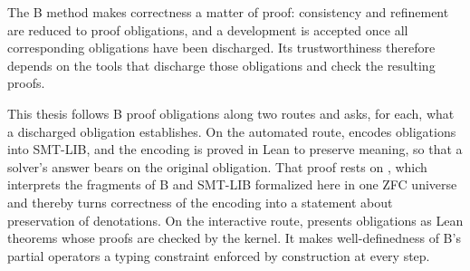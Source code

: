 The B method makes correctness a matter of proof: consistency and refinement are
reduced to proof obligations, and a development is accepted once all
corresponding obligations have been discharged. Its trustworthiness therefore
depends on the tools that discharge those obligations and check the resulting
proofs.

This thesis follows B proof obligations along two routes and asks, for each, what
a discharged obligation establishes. On the automated route, \beer{} encodes
obligations into SMT-LIB, and the encoding is proved in Lean to preserve meaning,
so that a solver's answer bears on the original obligation. That proof rests on
\zflean{}, which interprets the fragments of B and SMT-LIB formalized here in one
ZFC universe and thereby turns correctness of the encoding into a statement about
preservation of denotations. On the interactive route, \barrel{} presents
obligations as Lean theorems whose proofs are checked by the kernel. It makes
well-definedness of B's partial operators a typing constraint enforced by construction at every
step.
